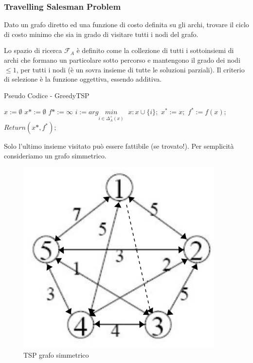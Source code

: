 \documentclass{article}
\begin{document}
    \subsubsection{Travelling Salesman Problem}
    Dato un grafo diretto ed una funzione di costo definita su gli archi, trovare il ciclo di costo
    minimo che sia in grado di visitare tutti i nodi del grafo.

    Lo spazio di ricerca $\mathcal{F}_A$ è definito come la collezione di tutti i sottoinsiemi di archi che
    formano un particolare sotto percorso e mantengono il grado dei nodi $\leq 1$, per tutti i nodi (è
    un sovra insieme di tutte le soluzioni parziali).
    Il criterio di selezione è la funzione oggettiva, essendo additiva.

    \begin{algorithm}[H]
        \caption{Pseudo Codice - GreedyTSP}
        \begin{algorithmic}
            \State $x:=\emptyset$
            \State $x*:=\emptyset$
            \State $f*:=\infty$
            \State $i:=arg\underset{i \in \Delta_A^+(x)}{min}\;$
            \State $x:x\cup\{i\};$
            \EndWhile
            \State $x^*:=x;$
            \State $f^*:=f(x);$
            \EndIf
            \State $Return(x*,f^*);$
        \end{algorithmic}
    \end{algorithm}
    Solo l'ultimo insieme visitato può essere fattibile (se trovato!).
    Per semplicità consideriamo un grafo simmetrico.
    \begin{figure}[H]
        \centering
        \includegraphics[scale=0.5]{images/TSP_simm.png}
        \caption{TSP grafo simmetrico}
    \end{figure}
\end{document}
